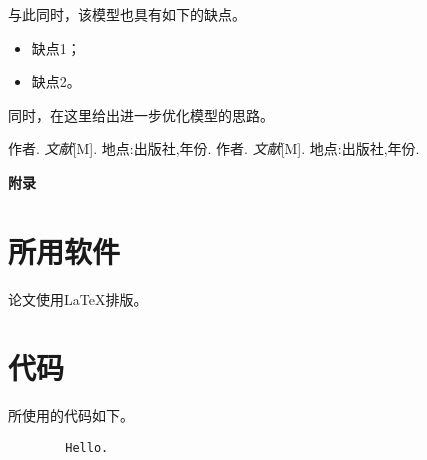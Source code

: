 \documentclass[12pt, a4paper, oneside]{ctexart}
\renewcommand{\thesection}{\zhnum{section}}
\begin{document}
与此同时，该模型也具有如下的缺点。
\begin{itemize}
    \item 缺点1；
    \item 缺点2。
\end{itemize}
同时，在这里给出进一步优化模型的思路。

\begin{thebibliography}{99}
    作者. \emph{文献}[M]. 地点:出版社,年份.
    作者. \emph{文献}[M]. 地点:出版社,年份.
\end{thebibliography}

\begin{center}
    \Large{\textbf{附录}}
\end{center}

\begin{appendices}
    \renewcommand{\thesection}{\Alph{section}}
    \section{所用软件}
        论文使用\LaTeX 排版。
    \section{代码}
        所使用的代码如下。
	\begin{lstlisting}
		Hello. 
	\end{lstlisting}
\end{appendices}
\end{document}
